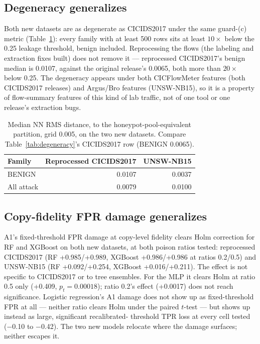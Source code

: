 \subsection{Degeneracy generalizes}
Both new datasets are as degenerate as CICIDS2017 under the same guard-(c) metric
(Table~\ref{tab:degeneracy-new}): every family with at least 500  rows sits at
least $10\times$ below the 0.25 leakage threshold, benign included. Reprocessing the flows (the
labeling and extraction fixes \citet{liu2022error} built) does not remove it — reprocessed
CICIDS2017's benign median is 0.0107, against the original release's 0.0065, both more than
$20\times$ below 0.25. The degeneracy appears under both CICFlowMeter features (both CICIDS2017
releases) and Argus/Bro features (UNSW-NB15), so it is a property of flow-summary features of
this kind of lab traffic, not of one tool or one release's extraction bugs.

\begin{table}[t]
  \centering
  \caption{Median NN RMS distance, \texorpdfstring{}{trusted\_eval} to the
  honeypot-pool-equivalent partition, grid 0.005, on the two new datasets. Compare
  Table~\ref{tab:degeneracy}'s CICIDS2017 row (BENIGN 0.0065).}
  \label{tab:degeneracy-new}
  \small
  \begin{tabular}{lrr}
    \toprule
    Family & Reprocessed CICIDS2017 & UNSW-NB15 \\
    \midrule
    BENIGN      & 0.0107 & 0.0037 \\
    All attack  & 0.0079 & 0.0100 \\
    \bottomrule
  \end{tabular}
\end{table}

\subsection{Copy-fidelity FPR damage generalizes}
A1's fixed-threshold FPR damage at copy-level fidelity clears Holm correction for RF and XGBoost
on both new datasets, at both poison ratios tested: reprocessed CICIDS2017 (RF +0.985/+0.989,
XGBoost +0.986/+0.986 at ratios 0.2/0.5) and UNSW-NB15 (RF +0.092/+0.254, XGBoost +0.016/+0.211).
The effect is not specific to CICIDS2017 or to tree ensembles. For the MLP it clears Holm at
ratio 0.5 only (+0.409, $p_t=0.00018$); ratio 0.2's effect (+0.0017) does not reach significance.
Logistic regression's A1 damage does not show up as fixed-threshold FPR at all — neither ratio
clears Holm under the paired $t$-test — but shows up instead as large, significant recalibrated-
threshold TPR loss at every cell tested (−0.10 to −0.42). The two new models relocate where the
damage surfaces; neither escapes it.

